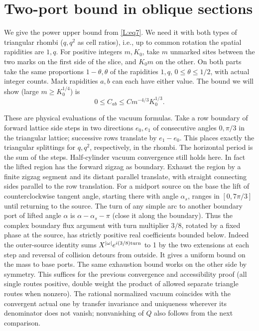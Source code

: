 \section{Two-port bound in oblique sections}\label{L:part9}

We give the power upper bound from \eqref{L:eq7}. We need it with both types of triangular rhombi (\(q,q^2\) as cell ratios), i.e., up to common rotation the spatial rapidities are \(1,q\). For positive integers \(m,K_0\), take \(m\) unmarked sites between the two marks on the first side of the slice, and \(K_0m\) on the other. On both parts take the same proportions \(1-\theta,\theta\) of the rapidities \(1,q\), \(0\le\theta\le1/2\), with actual integer counts. Mark rapidities \(a,b\) can each have either value. The bound we will show (large \(m\ge K_0^{1/4}\)) is
\begin{equation}
 0\le C_{ab}\le C m^{-4/3}K_0^{1/3}.\label{L:eq8}
\end{equation}

These are physical evaluations of the vacuum formulas. Take a row boundary of forward lattice side steps in two directions \(e_0,e_1\) of consecutive angles \(0,\pi/3\) in the triangular lattice; successive rows translate by \(e_1-e_0\). This places exactly the triangular splittings for \(q,q^2\), respectively, in the rhombi. The horizontal period is the sum of the steps. Half-cylinder vacuum convergence still holds here. In fact the lifted region has the forward zigzag as boundary. Exhaust the region by a finite zigzag segment and its distant parallel translate, with straight connecting sides parallel to the row translation. For a midport source on the base the lift of counterclockwise tangent angle, starting there with angle \(\alpha_s\), ranges in \([0,7\pi/3]\) until returning to the source. The turn of any simple arc to another boundary port of lifted angle \(\alpha\) is \(\alpha-\alpha_s-\pi\) (close it along the boundary). Thus the complex boundary flux argument with turn multiplier \(3/8\), rotated by a fixed phase at the source, has strictly positive real coefficients bounded below. Indeed the outer-source identity sums \(X^{|\omega|}e^{i(3/8){\rm turn}}\) to 1 by the two extensions at each step and reversal of collision detours from outside. It gives a uniform bound on the mass to base ports. The same exhaustion bound works on the other side by symmetry. This suffices for the previous convergence and accessibility proof (all single routes positive, double weight the product of allowed separate triangle routes when nonzero). The rational normalized vacuum coincides with the convergent actual one by transfer invariance and uniqueness wherever its denominator does not vanish; nonvanishing of \(Q\) also follows from the next comparison.

